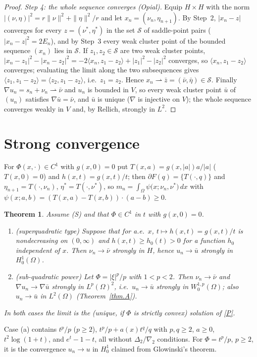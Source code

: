 \documentclass[11pt]{amsart}
\newtheorem{teo}{Theorem}
\theoremstyle{remark}
\theoremstyle{definition}
\newcommand{\dx}{\,dx}
\begin{document}
\begin{proof}
\emph{Step 4: the whole sequence converges (Opial).} Equip $H\times H$ with the norm $|(\nu,\eta)|^2=r\|\nu\|^2+\|\eta\|^2/r$ and let $x_n=(\nu_n,\eta_{n+1})$. By Step~2, $|x_n-z|$ converges for every $z=(\nu^*,\eta^*)$ in the set $\mathcal S$ of saddle-point pairs ($|x_n-z|^2=2E_n$), and by Step~3 every weak cluster point of the bounded sequence $(x_n)$ lies in $\mathcal S$. If $z_1,z_2\in\mathcal S$ are two weak cluster points, $|x_n-z_1|^2-|x_n-z_2|^2=-2\langle x_n,z_1-z_2\rangle+|z_1|^2-|z_2|^2$ converges, so $\langle x_n,z_1-z_2\rangle$ converges; evaluating the limit along the two subsequences gives $\langle z_1,z_1-z_2\rangle=\langle z_2,z_1-z_2\rangle$, i.e.\ $z_1=z_2$. Hence $x_n\rightharpoonup\bar z=(\bar\nu,\bar\eta)\in\mathcal S$. Finally $\nabla u_n=s_n+\nu_n\rightharpoonup\bar\nu$ and $u_n$ is bounded in $V$, so every weak cluster point $\bar u$ of $(u_n)$ satisfies $\nabla\bar u=\bar\nu$, and $\bar u$ is unique ($\nabla$ is injective on $V$); the whole sequence converges weakly in $V$ and, by Rellich, strongly in $L^2$.
\end{proof}

\section{Strong convergence}
For $\Phi(x,\cdot)\in C^1$ with $g(x,0)=0$ put $T(x,a)=g(x,|a|)a/|a|$ ($T(x,0)=0$) and $h(x,t)=g(x,t)/t$; then $\partial F(q)=\{T(\cdot,q)\}$ and $\eta_{n+1}=T(\cdot,\nu_n)$, $\eta^*=T(\cdot,\nu^*)$, so
$m_n=\int_\Omega\psi\big(x;\nu_n,\nu^*\big)\dx$ with $\psi(x;a,b)=(T(x,a)-T(x,b))\cdot(a-b)\ge0$.

\begin{teo}\label{thm.B}
Assume (S) and that $\Phi\in C^1$ in $t$ with $g(x,0)=0$.
\begin{enumerate}
\item[(a)] \emph{(superquadratic type)} Suppose that for a.e.\ $x$, $t\mapsto h(x,t)=g(x,t)/t$ is nondecreasing on $(0,\infty)$ and $h(x,t)\ge h_0(t)>0$ for a function $h_0$ independent of $x$. Then $\nu_n\to\bar\nu$ strongly in $H$, hence $u_n\to\bar u$ strongly in $H^1_0(\Omega)$.
\item[(b)] \emph{(sub-quadratic power)} Let $\Phi=|\xi|^p/p$ with $1<p<2$. Then $\nu_n\to\bar\nu$ and $\nabla u_n\to\nabla\bar u$ strongly in $L^p(\Omega)^2$, i.e.\ $u_n\to\bar u$ strongly in $W^{1,p}_0(\Omega)$; also $u_n\to\bar u$ in $L^2(\Omega)$ (Theorem~\ref{thm.A}).
\end{enumerate}
In both cases the limit is the (unique, if $\Phi$ is strictly convex) solution of \eqref{P}.
\end{teo}
Case (a) contains $t^p/p$ ($p\ge2$), $t^p/p+a(x)t^q/q$ with $p,q\ge2$, $a\ge0$, $t^2\log(1+t)$, and $e^t-1-t$, all without $\Delta_2$/$\nabla_2$ conditions. For $\Phi=t^p/p$, $p\ge2$, it is the convergence $u_n\to u$ in $H^1_0$ claimed from Glowinski's theorem.
\end{document}
